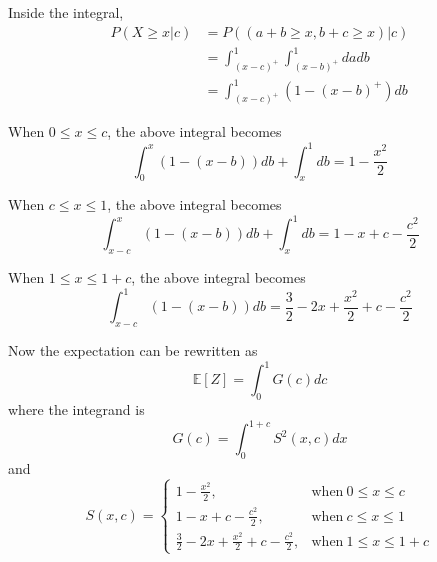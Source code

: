 \documentclass[12pt]{simple_doc}
\begin{document}
    Inside the integral,
    \begin{equation*}
        \begin{aligned}
        P(X \geqslant x | c) &= P((a + b \geqslant x, b + c \geqslant x)|c)\\
            &= \int_{(x-c)^+}^1 \int_{(x-b)^+}^1 da db\\
            &= \int_{(x-c)^+}^1 (1 - (x-b)^+) db
        \end{aligned}
    \end{equation*}

    When $0 \leqslant x \leqslant c$, the above integral becomes
    \begin{equation*}
        \int_0^x (1 - (x-b)) db + \int_x^1 db = 1 - \frac{x^2}{2}
    \end{equation*}

    When $c \leqslant x \leqslant 1$, the above integral becomes
    \begin{equation*}
        \int_{x-c}^x (1 - (x-b)) db + \int_x^1 db = 1 - x + c - \frac{c^2}{2}
    \end{equation*}

    When $1 \leqslant x \leqslant 1 + c$, the above integral becomes
    \begin{equation*}
        \int_{x-c}^1 (1 - (x-b)) db = \frac{3}{2} - 2x + \frac{x^2}{2} + c - \frac{c^2}{2}
    \end{equation*}

    Now the expectation can be rewritten as
    \begin{equation*}
        \mathbb{E}[Z] = \int_0^1 G(c) dc
    \end{equation*}
    where the integrand is
    \begin{equation*}
        G(c) = \int_0^{1 + c} S^2(x, c) dx
    \end{equation*}
    and
    \begin{equation*}
        S(x, c) =
            \begin{cases}
              1 - \frac{x^2}{2}, & \text{when}\ 0 \leqslant x \leqslant c\\
              1 - x + c - \frac{c^2}{2}, & \text{when}\ c \leqslant x \leqslant 1\\
              \frac{3}{2} - 2x + \frac{x^2}{2} + c - \frac{c^2}{2}, & \text{when}\ 1 \leqslant x \leqslant 1 + c
            \end{cases}
    \end{equation*}
\end{document}
